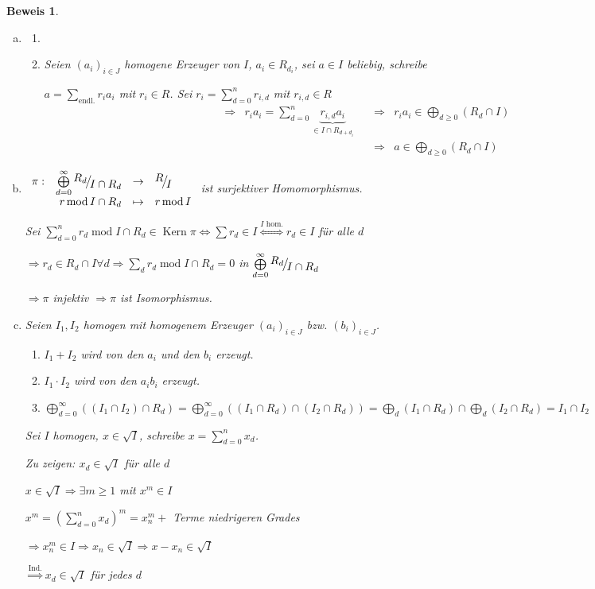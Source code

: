 \documentclass[a4paper, 12pt, numbers=noendperiod, chapterprefix=true, headsepline]{scrbook}
\theoremstyle{break}
\theoremstyle{nonumberbreak}
\newtheorem{Bew}{Beweis}
\theoremstyle{nonumberplain}
\newcommand{\quot}[1]{\textrm{\glqq}{#1}\textrm{\grqq}}
\newcommand{\Sum}{\sum\limits}
\newenvironment{twosidedproof}{\begin{enumerate}[\quot{$\Rightarrow$}:]}{\end{enumerate}}
\newcommand{\proofforward}{\item[\quot{$\Rightarrow$}:]}
\newcommand{\proofreverse}{\item[\quot{$\Leftarrow$}:]}
\DeclareMathOperator{\Kern}{Kern}
\DeclareMathOperator{\modmodulo}{mod}%
\newcommand{\FakRaum}[2]{
  \raisebox{0.7ex}{\ensuremath{#1}}
  \ensuremath{\mkern-3mu}\big/\ensuremath{\mkern-3mu}
  \raisebox{-0.6ex}{\ensuremath{#2}}}
\begin{document}
\begin{Bew}\begin{enumerate}[a)]
\item[e)]\begin{twosidedproof}
\proofreverse\checkmark

\proofforward
	Seien $(a_i)_{i\in J}$ homogene Erzeuger von $I$, $a_i\in R_{d_i}$, sei $a\in I$ beliebig, schreibe
	
	$a = \Sum_{\text{endl.}}r_ia_i$ mit $r_i\in R$. Sei $r_i=\Sum_{d=0}^n r_{i,d}$ mit $r_{i,d}\in R$
		\[\begin{array}{lrrr}\Rightarrow &
		r_ia_i=\sum\limits_{d=0}^n \underbrace{r_{i,d}a_i}_{\in I\cap R_{d+d_i}} & \quad\Rightarrow & r_ia_i\in \bigoplus\limits_{d\ge0}(R_d\cap I)\\
		&& \quad \Rightarrow & a\in \bigoplus\limits_{d\ge0}(R_d\cap I)
		\end{array}\]
\end{twosidedproof}

\item[f)]
	$\begin{array}{crcl}
		\pi:&\bigoplus\limits_{d=0}^{\infty}\FakRaum{R_d}{I\cap R_d} &\to& \FakRaum{R}{I}\\
		&r\modmodulo I\cap R_d &\mapsto& r\modmodulo I
	\end{array}$ ist surjektiver Homomorphismus.
	
	Sei $\Sum_{d=0}^n r_d\modmodulo I\cap R_d\in \Kern{\pi} \Leftrightarrow \sum r_d\in I \overset{I\text{ hom.}}{\Longleftrightarrow} r_d\in I$ f\"ur alle $d$
	
	$\Rightarrow r_d\in R_d\cap I \forall d\Rightarrow \Sum_d r_d\modmodulo I\cap R_d=0$ in $\bigoplus\limits_{d=0}^{\infty}\FakRaum{R_d}{I\cap R_d}$
	
	$\Rightarrow \pi$ injektiv $\Rightarrow \pi$ ist Isomorphismus.
\item[g)]
	Seien $I_1,I_2$ homogen mit homogenem Erzeuger $(a_i)_{i\in J}$ bzw. $(b_i)_{i\in J}$.
	\begin{enumerate}[$\bullet$]
	\item
		$I_1+I_2$ wird von den $a_i$ und den $b_i$ erzeugt.
	\item
		$I_1\cdot I_2$ wird von den $a_ib_i$ erzeugt.
	\item
		$\bigoplus\limits_{d=0}^{\infty}((I_1\cap I_2)\cap R_d)=\bigoplus\limits_{d=0}^{\infty}((I_1\cap R_d)\cap (I_2\cap R_d)) = \bigoplus\limits_d(I_1\cap R_d)\cap \bigoplus\limits_d(I_2\cap R_d)=I_1\cap I_2$
	\end{enumerate}
	Sei $I$ homogen, $x\in \sqrt{I}$, schreibe $x=\Sum_{d=0}^n x_d$.
	
	\emph{Zu zeigen:} $x_d\in\sqrt{I}$ f\"ur alle $d$
	
	$x\in \sqrt{I} \Rightarrow \exists m\ge 1$ mit $x^m\in I$
	
	$x^m=(\Sum_{d=0}^n x_d)^m = x_n^m +$ Terme niedrigeren Grades
	
	$\Rightarrow x_n^m\in I\Rightarrow x_n\in \sqrt{I} \Rightarrow x-x_n\in\sqrt I$
	
	$\overset{\text{Ind.}}{\Longrightarrow}x_d\in\sqrt I$ f\"ur jedes $d$
\end{enumerate}\end{Bew}
\end{document}
